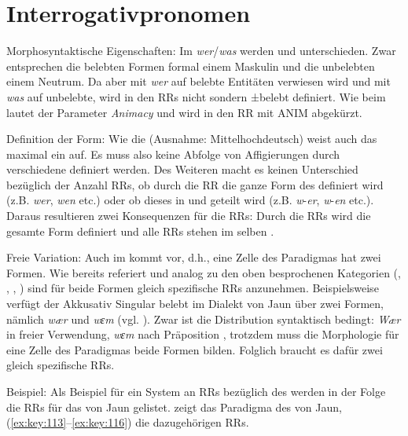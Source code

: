 \section{Interrogativpronomen}\label{5.4}

{Morphosyntaktische Eigenschaften}: Im  \textit{wer}/\textit{was} werden  und  unterschieden. Zwar entsprechen die belebten Formen formal einem Maskulin und die unbelebten einem Neutrum. Da aber mit \textit{wer} auf belebte Entitäten verwiesen wird und mit \textit{was} auf unbelebte, wird in den RRs nicht  sondern ±belebt definiert. Wie beim  lautet der Parameter \textit{Animacy} und wird in den RR mit ANIM abgekürzt.\largerpage

{Definition der Form}: Wie die  (Ausnahme: Mittelhochdeutsch) weist auch das  maximal ein  auf. Es muss also keine Abfolge von Affigierungen durch verschiedene  definiert werden. Des Weiteren macht es keinen Unterschied bezüglich der Anzahl RRs, ob durch die RR die ganze Form des  definiert wird (z.B. \textit{wer}, \textit{wen} etc.) oder ob dieses in  und  geteilt wird (z.B. \textit{w}-\textit{er}, \textit{w}-\textit{en} etc.). Daraus resultieren zwei Konsequenzen für die RRs: Durch die RRs wird die gesamte Form definiert und alle RRs stehen im selben .

{Freie Variation}: Auch im  kommt  vor, d.h., eine Zelle des Paradigmas hat zwei Formen. Wie bereits referiert und analog zu den oben besprochenen Kategorien (, , , ) sind für beide Formen gleich spezifische RRs anzunehmen. Beispielsweise verfügt der Akkusativ Singular belebt im Dialekt von Jaun über zwei Formen, nämlich \textit{wær} und \textit{wɛm} (vgl. ). Zwar ist die Distribution syntaktisch bedingt: \textit{Wær} in freier Verwendung, \textit{wɛm} nach Präposition \citep[285]{Stucki1917}, trotzdem muss die Morphologie für eine Zelle des Paradigmas beide Formen bilden. Folglich braucht es dafür zwei gleich spezifische RRs.

{Beispiel}: Als Beispiel für ein System an RRs bezüglich des  werden in der Folge die RRs für das  von Jaun gelistet.  zeigt das Paradigma des  von Jaun, (\ref{ex:key:113}--\ref{ex:key:116}) die dazugehörigen RRs.

